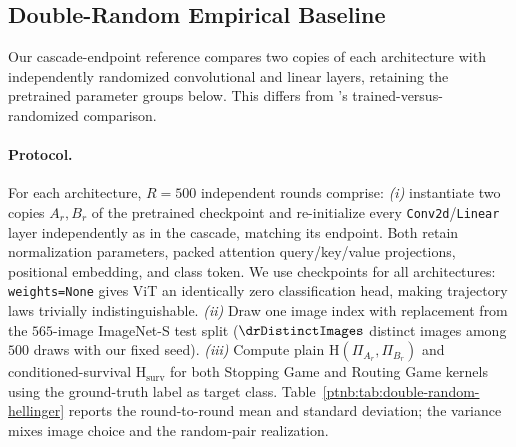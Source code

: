 

\subsection{Double-Random Empirical Baseline}\label{ptnb:sec:lmp-rand-double-random}

Our cascade-endpoint reference compares two copies of each architecture with independently randomized convolutional and linear layers, retaining the pretrained parameter groups below. This differs from \textcite{Adebayo2018sanity}'s trained-versus-randomized comparison.

\paragraph{Protocol.}
For each architecture, $R = 500$ independent rounds comprise: \emph{(i)} instantiate two copies $A_r, B_r$ of the pretrained checkpoint and re-initialize every \texttt{Conv2d}/\texttt{Linear} layer independently as in the cascade, matching its endpoint. Both retain normalization parameters, packed attention query/key/value projections, positional embedding, and class token. We use checkpoints for all architectures: \texttt{weights=None} gives ViT an identically zero classification head, making trajectory laws trivially indistinguishable. \emph{(ii)} Draw one image index with replacement from the $565$-image ImageNet-S test split ($\drDistinctImages$ distinct images among $500$ draws with our fixed seed). \emph{(iii)} Compute plain $\mathrm{H}(\Pi_{A_r}, \Pi_{B_r})$ and conditioned-survival $\mathrm{H}_{\mathrm{surv}}$ for both Stopping Game and Routing Game kernels using the ground-truth label as target class. Table~\ref{ptnb:tab:double-random-hellinger} reports the round-to-round mean and standard deviation; the variance mixes image choice and the random-pair realization.

\begin{table}[H]
\TableContent{
    \centering
    \small
    
    }%
\caption[Hellinger trajectory distance at the double-random baseline]{Double-random Hellinger distances, mean $\pm$ standard deviation over $R=500$ rounds. Each round pairs independently randomized copies of the architecture on one sampled ImageNet-S test image, retaining the pretrained parameter groups specified above.}
    \label{ptnb:tab:double-random-hellinger}
\end{table}

